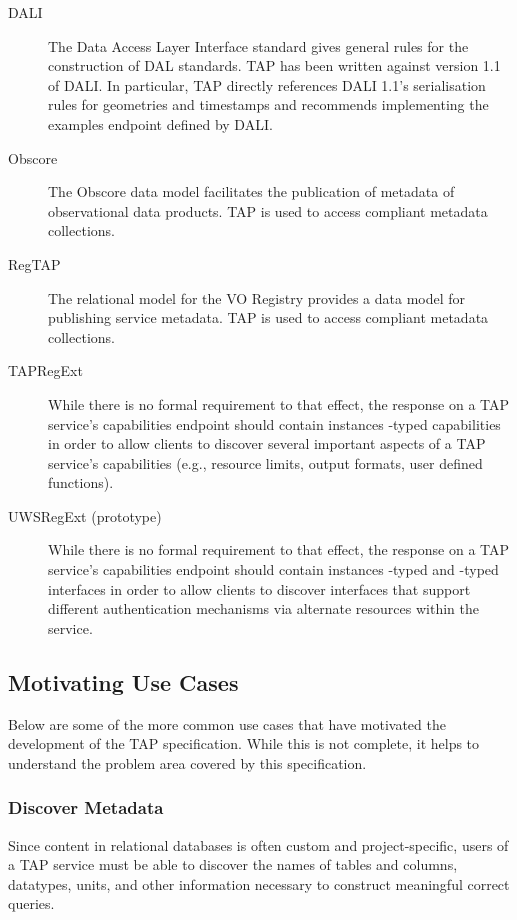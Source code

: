 \documentclass[11pt,letter]{ivoa}
\begin{document}
\begin{description}
\item[DALI \citep{std:DALI11}]  The Data Access Layer Interface standard
gives general rules for the construction of DAL standards.  TAP has been
written against version 1.1 of DALI.  In particular, TAP directly
references DALI 1.1's serialisation rules for geometries and timestamps
and recommends implementing the examples endpoint defined by DALI.

\item[Obscore \citep{2011ivoa.spec.1028T}] The Obscore data model
facilitates the publication of metadata of observational data products.
TAP is used to access compliant metadata collections.

\item[RegTAP \citep{2014ivoa.spec.1208D}]  The relational model for the
VO Registry provides a data model for publishing service metadata.
TAP is used to access compliant metadata collections.

\item[TAPRegExt \citep{2012ivoa.spec.0827D}] While there is no formal
requirement to that effect, the response on a TAP service's capabilities
endpoint should contain instances -typed
capabilities in order to allow clients to discover several important
aspects of a TAP service's capabilities (e.g., resource limits, output
formats, user defined functions).

\item[UWSRegExt (prototype)] While there is no formal
requirement to that effect, the response on a TAP service's capabilities
endpoint should contain instances -typed and
-typed interfaces in order to allow clients to discover 
interfaces that support different authentication mechanisms via alternate
resources within the service.
\end{description}



\subsection{Motivating Use Cases}
Below are some of the more common use cases that have motivated the development 
of the TAP specification. While this is not complete, it helps to understand the 
problem area covered by this specification.

\subsubsection{Discover Metadata}
Since content in relational databases is often custom and project-specific, 
users of a TAP service must be able to discover the names of tables and 
columns, datatypes, units, and other information necessary to construct 
meaningful correct queries.
\end{document}
